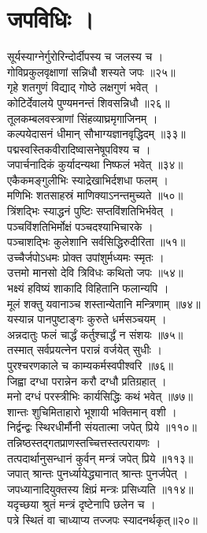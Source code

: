 \section{जपविधिः ।}

सूर्यस्याग्नेर्गुरोरिन्दोर्दीपस्य च जलस्य च ।\\[-2mm]
गोविप्रकुलवृक्षाणां सन्निधौ शस्यते जपः ॥२५॥\\
गृहे शतगुणं विद्याद् गोष्ठे लक्षगुणं भवेत् ।\\[-2mm]
कोटिर्देवालये पुण्यमनन्तं शिवसन्निधौ ॥२६॥\\
तूलकम्बलवस्त्राणां सिंहव्याघ्रमृगाजिनम् ।\\[-2mm]
कल्पयेदासनं धीमान् सौभाग्यज्ञानवृद्धिदम् ॥३३॥\\
पद्मस्वस्तिकवीरादिष्वासनेषूपविश्य च ।\\[-2mm]
जपार्चनादिकं कुर्यादन्यथा निष्फलं भवेत् ॥३४॥\\
एकैकमङ्गुलीभिः स्याद्रेखाभिर्दशधा फलम् ।\\[-2mm]
मणिभिः शतसाहस्रं माणिक्याऽनन्तमुच्यते ॥५०॥\\
त्रिंशद्भिः स्याद्धनं पुष्टिः सप्तविंशतिभिर्भवेत् ।\\[-2mm]
पञ्चविंशतिभिर्मोक्षं पञ्चदश्याभिचारके ।\\[-2mm]
पञ्चाशद्भिः कुलेशानि सर्वसिद्धिरुदीरिता ॥५१॥\\
उच्चैर्जपोऽधमः प्रोक्त उपांशुर्मध्यमः स्मृतः ।\\[-2mm]
उत्तमो मानसो देवि त्रिविधः कथितो जपः ॥५४॥\\

भक्ष्यं हविष्यं शाकादि विहितानि फलान्यपि ।\\[-2mm]
मूलं शक्तु यवानाञ्च शस्तान्येतानि मन्त्रिणाम् ॥७४॥\\
यस्यान्न पानपुष्टाङ्गः कुरुते धर्मसञ्चयम् ।\\[-2mm]
अन्नदातुः फलं चार्द्धं कर्तुश्चार्द्धं न संशयः ॥७५॥\\
तस्मात् सर्वप्रयत्नेन परान्नं वर्जयेत् सुधीः ।\\[-2mm]
पुरश्चरणकाले च काम्यकर्मस्वपीश्वरि ॥७६॥\\
जिह्वा दग्धा परान्नेन करौ दग्धौ प्रतिग्रहात् ।\\[-2mm]
मनो दग्धं परस्त्रीभिः कार्यसिद्धिः कथं भवेत् ॥७७॥\\
शान्तः शुचिमिताहारो भूशायी भक्तिमान् वशी ।\\[-2mm]
निर्द्वन्द्वः स्थिरधीर्मौनी संयतात्मा जपेत् प्रिये ॥११०॥\\
तन्निष्ठस्तद्गतप्राणस्तच्चित्तस्तत्परायणः ।\\[-2mm]
तत्पदार्थानुसन्धानं  कुर्वन् मन्त्रं जपेत् प्रिये ॥११३॥\\
जपात् श्रान्तः पुनर्ध्यायेद्ध्यानात् श्रान्तः पुनर्जपेत् ।\\[-2mm]
जपध्यानादियुक्तस्य क्षिप्रं मन्त्रः प्रसिध्यति ॥११४॥\\
यदृच्छया श्रुतं मन्त्रं दृष्टेनापि छलेन च ।\\[-2mm]
पत्रे स्थितं वा चाध्याप्य तज्जपः स्यादनर्थकृत्॥२०॥\\

